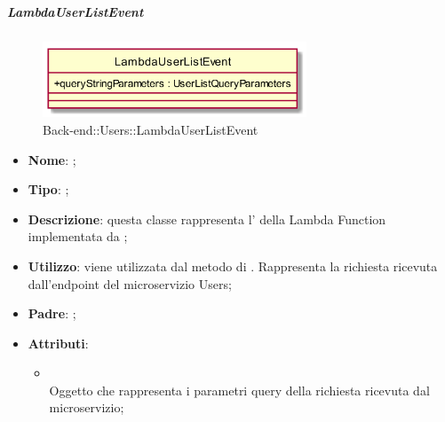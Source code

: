 \hypertarget{LambdaUserListEvent_label}{\subparagraph{LambdaUserListEvent}}
\begin{figure}[h]
	\centering
	\includegraphics[width=0.70\textwidth,height=\textheight,keepaspectratio]{images/ClassLambdaUserListEvent.png}
	\caption{Back-end::Users::LambdaUserListEvent}
\end{figure}
\begin{itemize}
	\item \textbf{Nome}: ;
	\item \textbf{Tipo}: ;
	\item \textbf{Descrizione}: questa classe rappresenta l' della Lambda Function implementata da ;
	\item \textbf{Utilizzo}: viene utilizzata dal metodo  di . Rappresenta la richiesta ricevuta dall'endpoint del microservizio Users;
	\item \textbf{Padre}: ;
	\item \textbf{Attributi}:
	\begin{itemize}
		\item[]  \\
		Oggetto che rappresenta i parametri query della richiesta ricevuta dal microservizio;
	\end{itemize}
\end{itemize}
\FloatBarrier

